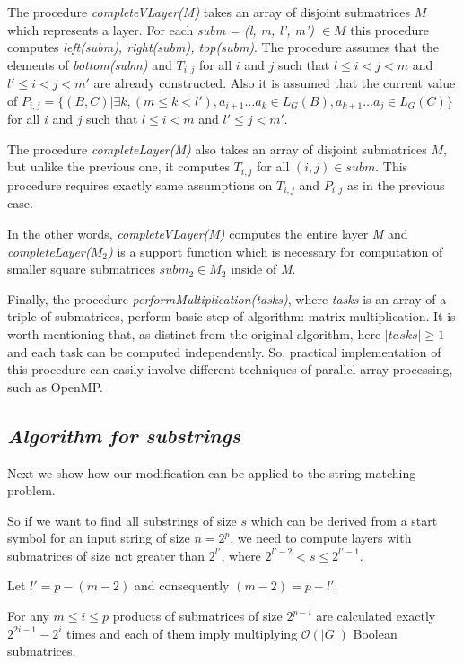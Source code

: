The procedure \textit{completeVLayer(M)} takes an array of disjoint submatrices $M$ which represents a layer.
For each \textit{subm = (l, m, l', m') $\in M$} this procedure computes \textit{left(subm), right(subm), top(subm)}.
The procedure assumes that the elements of \textit{bottom(subm)} and $T_{i, j}$ for all $i$ and $j$ such that $l \leq i < j < m$ and $  l' \leq i < j < m'$ are already constructed.
Also it is assumed that the current value of
$P_{i, j} =  \{ (B, C) | \exists k, (m \le k < l'), a_{i + 1} \dots a_{k} \in L_G(B), a_{k + 1} \dots a_{j} \in L_G(C)\} $ for all $i$ and $j$ such that $l \leq i < m$ and $l' \leq j < m'$.

The procedure \textit{completeLayer(M)} also takes an array of disjoint submatrices $M$, but unlike the previous one, it computes $T_{i, j}$ for all $(i, j) \in subm$.
This procedure requires exactly same assumptions on $T_{i, j}$  and $P_{i, j}$  as in the previous case.

In the other words, \textit{completeVLayer(M)} computes the entire layer \textit{M} \linebreak and \textit{completeLayer($M_{2}$)} is a support function which is necessary for computation of smaller square submatrices $subm_{2} \in M_{2}$ inside of \textit{M}.

Finally, the procedure \textit{performMultiplication(tasks)}, where \textit{tasks} is an array of a triple of submatrices, perform basic step of algorithm: matrix multiplication. It is worth mentioning that, as distinct from the original algorithm, here $|tasks| \ge 1$ and each task can be computed independently.
So, practical implementation of this procedure can easily involve different techniques of parallel array processing, such as OpenMP.

\subsection{\bf \it Algorithm for substrings}

Next we show how our modification can be applied to the string-matching problem.

So if we want to find all substrings of size $s$ which can be derived from a start symbol for an input string of size $n = 2^p$, we need to compute layers with submatrices of size not greater than $2^{l'}$, where $2^{l' - 2} < s \le 2^{l' - 1}$.

Let $l' = p - (m - 2)$ and consequently $(m - 2) = p - l'$.

For any  $m \le i \le p$ products of submatrices of size $2^{p - i}$ are calculated exactly $2^{2i - 1} - 2^{i}$ times and each of them imply multiplying $\mathcal{O}(|G|)$ Boolean submatrices.

